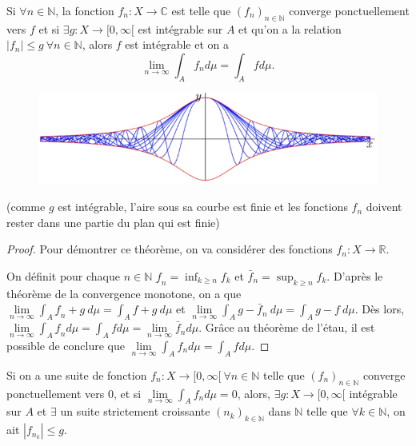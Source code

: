 \begin{theo}
    Si $\forall n\in\mathbb{N}$, la fonction $f_n:X\to\mathbb{C}$ est telle que $(f_n)_{n\in\mathbb{N}}$ converge ponctuellement vers $f$ et si $\exists g:X\to[0,\infty[$ est intégrable sur $A$ et qu'on a la relation $|f_n|\leq g\ \forall n\in\mathbb{N}$, alors $f$ est intégrable et on a
    \begin{equation*}
        \lim\limits_{n\to\infty}\int_A f_nd\mu = \int_Afd\mu.
    \end{equation*}
    \begin{figure}[H]
        \centering
        \includegraphics{synthese_conv_dominee.PNG}
    \end{figure}
    (comme $g$ est intégrable, l'aire sous sa courbe est finie et les fonctions $f_n$ doivent rester dans une partie du plan qui est finie)
\end{theo}
\begin{proof}
    Pour démontrer ce théorème, on va considérer des fonctions $f_n:X\to\mathbb{R}$.
    
    On définit pour chaque $n\in\mathbb{N}$ $\underbar{f}_n = \inf_{k\geq n}f_k$ et $\bar{f}_n = \sup_{k\geq n}f_k$. D'après le théorème de la convergence monotone, on a que $\lim\limits_{n\to\infty}\int_A\underbar{f}_n+g\ d\mu = \int_Af+g\ d\mu$ et $\lim\limits_{n\to\infty}\int_Ag-\bar{f}_n\ d\mu = \int_Ag-f\ d\mu$. Dès lors, $\lim\limits_{n\to\infty}\int_A\underbar{f}_nd\mu = \int_Afd\mu=\lim\limits_{n\to\infty}\bar{f}_nd\mu$. Grâce au théorème de l'étau, il est possible de conclure que $\lim\limits_{n\to\infty}\int_Af_nd\mu=\int_Afd\mu$.
\end{proof}

\begin{theo}
    Si on a une suite de fonction $f_n:X\to[0,\infty[\ \forall n\in\mathbb{N}$ telle que $(f_n)_{n\in\mathbb{N}}$ converge ponctuellement vers $0$, et si $\lim\limits_{n\to\infty}\int_A f_nd\mu=0$, alors, $\exists g:X\to[0,\infty[$ intégrable sur $A$ et $\exists$ un suite strictement croissante $(n_k)_{k\in\mathbb{N}}$ dans $\mathbb{N}$ telle que $\forall k\in\mathbb{N}$, on ait $|f_{n_k}|\leq g$.
\end{theo}

